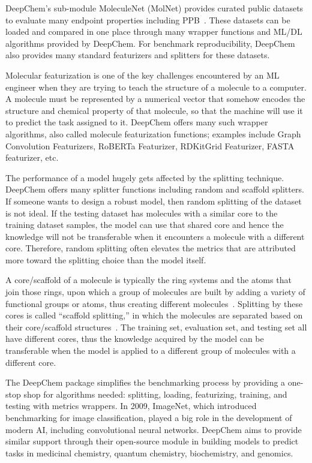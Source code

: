 \documentclass[11pt,a4paper]{article}
\begin{document}
DeepChem's sub-module MoleculeNet (MolNet) provides curated public datasets to evaluate many endpoint properties including PPB~\cite{wu2018moleculenet}.
These datasets can be loaded and compared in one place through many wrapper functions and ML/DL algorithms provided by DeepChem.
For benchmark reproducibility, DeepChem also provides many standard featurizers and splitters for these datasets.

Molecular featurization is one of the key challenges encountered by an ML engineer when they are trying to teach the structure of a molecule to a computer.
A molecule must be represented by a numerical vector that somehow encodes the structure and chemical property of that molecule, so that the machine will use it to predict the task assigned to it.
DeepChem offers many such wrapper algorithms, also called molecule featurization functions; examples include Graph Convolution Featurizers, RoBERTa Featurizer, RDKitGrid Featurizer, FASTA featurizer, etc.

The performance of a model hugely gets affected by the splitting technique.
DeepChem offers many splitter functions including random and scaffold splitters.
If someone wants to design a robust model, then random splitting of the dataset is not ideal.
If the testing dataset has molecules with a similar core to the training dataset samples, the model can use that shared core and hence the knowledge will not be transferable when it encounters a molecule with a different core.
Therefore, random splitting often elevates the metrics that are attributed more toward the splitting choice than the model itself.

A core/scaffold of a molecule is typically the ring systems and the atoms that join those rings, upon which a group of molecules are built by adding a variety of functional groups or atoms, thus creating different molecules~\cite{bemis1996scaffold}.
Splitting by these cores is called ``scaffold splitting,'' in which the molecules are separated based on their core/scaffold structures~\cite{wu2018moleculenet}.
The training set, evaluation set, and testing set all have different cores, thus the knowledge acquired by the model can be transferable when the model is applied to a different group of molecules with a different core.

The DeepChem package simplifies the benchmarking process by providing a one-stop shop for algorithms needed: splitting, loading, featurizing, training, and testing with metrics wrappers.
In 2009, ImageNet, which introduced benchmarking for image classification, played a big role in the development of modern AI, including convolutional neural networks.
DeepChem aims to provide similar support through their open-source module in building models to predict tasks in medicinal chemistry, quantum chemistry, biochemistry, and genomics.
\end{document}
